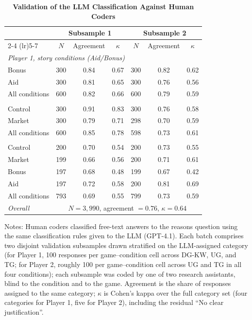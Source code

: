 \begin{table}[!htbp]
\centering
\caption{\textbf{Validation of the LLM Classification Against Human Coders}}
\label{tab:llm_human_agreement}
\begin{tabular}{lcccccc}
\toprule
 & \multicolumn{3}{c}{Subsample 1} & \multicolumn{3}{c}{Subsample 2} \\
\cmidrule(lr){2-4} \cmidrule(lr){5-7}
 & $N$ & Agreement & $\kappa$ & $N$ & Agreement & $\kappa$ \\
\midrule
\multicolumn{7}{l}{\emph{Player 1, story conditions (Aid/Bonus)}} \\
\quad Bonus & 300 & 0.84 & 0.67 & 300 & 0.82 & 0.62 \\
\quad Aid & 300 & 0.81 & 0.65 & 300 & 0.76 & 0.56 \\
\quad All conditions & 600 & 0.82 & 0.66 & 600 & 0.79 & 0.59 \\
\addlinespace
\multicolumn{7}{l}{\emph{Player 1, Market/Control}} \\
\quad Control & 300 & 0.91 & 0.83 & 300 & 0.76 & 0.58 \\
\quad Market & 300 & 0.79 & 0.71 & 298 & 0.70 & 0.59 \\
\quad All conditions & 600 & 0.85 & 0.78 & 598 & 0.73 & 0.61 \\
\addlinespace
\multicolumn{7}{l}{\emph{Player 2, all conditions}} \\
\quad Control & 200 & 0.70 & 0.54 & 200 & 0.73 & 0.55 \\
\quad Market & 199 & 0.66 & 0.56 & 200 & 0.71 & 0.61 \\
\quad Bonus & 197 & 0.68 & 0.48 & 199 & 0.67 & 0.42 \\
\quad Aid & 197 & 0.72 & 0.58 & 200 & 0.81 & 0.69 \\
\quad All conditions & 793 & 0.69 & 0.55 & 799 & 0.73 & 0.59 \\
\addlinespace
\emph{Overall} & \multicolumn{6}{c}{$N=3,990$, agreement $=0.76$, $\kappa=0.64$} \\
\bottomrule
\end{tabular}
\begin{flushleft}
\footnotesize Notes: Human coders classified free-text answers to the reasons question using the same classification rules given to the LLM (GPT-4.1). Each batch comprises two disjoint validation subsamples drawn stratified on the LLM-assigned category (for Player 1, 100 responses per game--condition cell across DG-KW, UG, and TG\@; for Player 2, roughly 100 per game--condition cell across UG and TG in all four conditions); each subsample was coded by one of two research assistants, blind to the condition and to the game. Agreement is the share of responses assigned to the same category; $\kappa$ is Cohen's kappa over the full category set (four categories for Player 1, five for Player 2), including the residual ``No clear justification''.
\end{flushleft}
\end{table}
